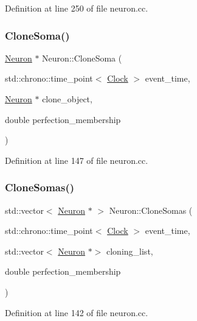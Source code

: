 Definition at line 250 of file neuron.\+cc.

\mbox{\label{class_neuron_a7706e0f722c70138458423c07b6b153b}} 
\subsubsection{\texorpdfstring{Clone\+Soma()}{CloneSoma()}}
{\footnotesize\ttfamily \mbox{\hyperlink{class_neuron}{Neuron}} $\ast$ Neuron\+::\+Clone\+Soma (\begin{DoxyParamCaption}\item[{std\+::chrono\+::time\+\_\+point$<$ \mbox{\hyperlink{universe_8h_a0ef8d951d1ca5ab3cfaf7ab4c7a6fd80}{Clock}} $>$}]{event\+\_\+time,  }\item[{\mbox{\hyperlink{class_neuron}{Neuron}} $\ast$}]{clone\+\_\+object,  }\item[{double}]{perfection\+\_\+membership }\end{DoxyParamCaption})}



Definition at line 147 of file neuron.\+cc.

\mbox{\label{class_neuron_a508841fa635a6e89609c514a79ea59da}} 
\subsubsection{\texorpdfstring{Clone\+Somas()}{CloneSomas()}}
{\footnotesize\ttfamily std\+::vector$<$ \mbox{\hyperlink{class_neuron}{Neuron}} $\ast$ $>$ Neuron\+::\+Clone\+Somas (\begin{DoxyParamCaption}\item[{std\+::chrono\+::time\+\_\+point$<$ \mbox{\hyperlink{universe_8h_a0ef8d951d1ca5ab3cfaf7ab4c7a6fd80}{Clock}} $>$}]{event\+\_\+time,  }\item[{std\+::vector$<$ \mbox{\hyperlink{class_neuron}{Neuron}} $\ast$$>$}]{cloning\+\_\+list,  }\item[{double}]{perfection\+\_\+membership }\end{DoxyParamCaption})}



Definition at line 142 of file neuron.\+cc.

\mbox{\label{class_neuron_af06efbcc1a96af0290673e9e048267cf}} 
